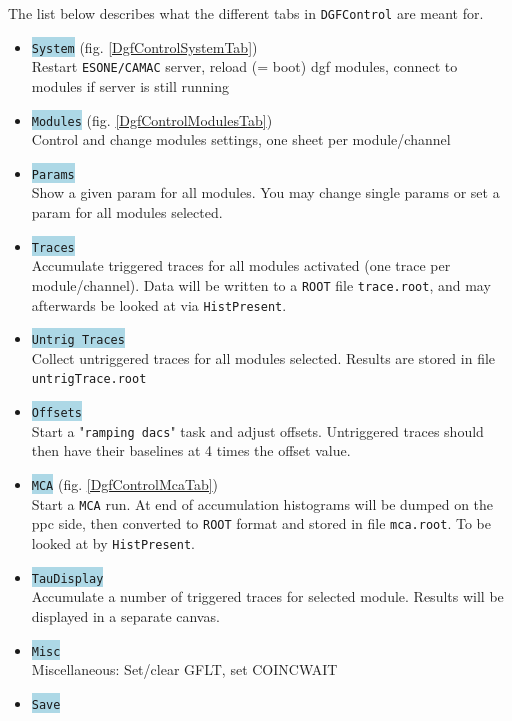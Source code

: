 \documentclass[10pt]{article}
\newcommand{\blue}[1]{\colorbox{lightblue}{\texttt{#1}}}
\begin{document}
The list below describes what the different tabs in \texttt{DGFControl} are meant for.\\
\begin{center}
\begin{itemize}
\setlength{\rightmargin}{1em}%
\setlength{\leftmargin}{2em}%
\setlength{\itemsep}{0pt}%
\setlength{\parskip}{1mm}%
\setlength{\partopsep}{0pt}%
\setlength{\parsep}{0pt}%
\setlength{\topsep}{0pt}%
\item	\blue{System} (fig. \ref{DgfControlSystemTab})\\
	Restart \texttt{ESONE/CAMAC} server, reload (= boot) dgf modules,
	connect to modules if server is still running
\item	\blue{Modules} (fig. \ref{DgfControlModulesTab})\\
	Control and change modules settings, one sheet per module/channel
\item	\blue{Params}\\
	Show a given param for all modules. You may change single params or set a param for all modules selected.
\item	\blue{Traces}\\
	Accumulate triggered traces for all modules activated (one trace per module/channel).
	Data will be written to a \texttt{ROOT} file \texttt{trace.root},
	and may afterwards be looked at via \texttt{HistPresent}.
\item	\blue{Untrig Traces}\\
	Collect untriggered traces for all modules selected. Results are stored in file \texttt{untrigTrace.root}
\item	\blue{Offsets}\\
	Start a "\texttt{ramping dacs}" task and adjust offsets. Untriggered traces should then have their baselines at
	4 times the offset value.
\item	\blue{MCA} (fig. \ref{DgfControlMcaTab})\\
	Start a \texttt{MCA} run. At end of accumulation histograms will be dumped on the ppc side, then converted to
	\texttt{ROOT} format and stored in file \texttt{mca.root}. To be looked at by \texttt{HistPresent}.
\item	\blue{TauDisplay}\\
	Accumulate a number of triggered traces for selected module. Results will be displayed in a separate canvas.
\item	\blue{Misc}\\
	Miscellaneous: Set/clear GFLT, set COINCWAIT
\item	\blue{Save}\\

\end{itemize}
\end{center}
\end{document}
